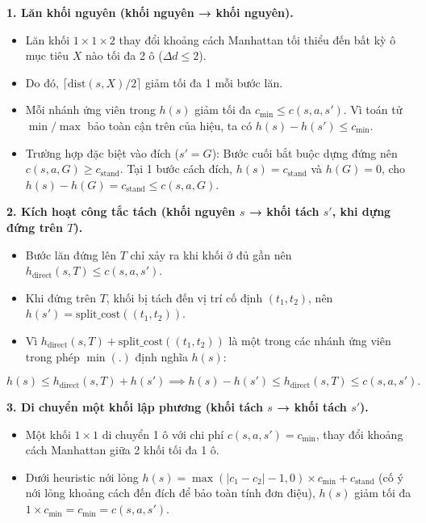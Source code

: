 \textbf{1. Lăn khối nguyên (khối nguyên → khối nguyên).}

\begin{itemize}
\item Lăn khối $1\times 1\times 2$ thay đổi khoảng cách Manhattan tối thiểu đến bất kỳ ô mục tiêu $X$ nào tối đa 2 ô ($\Delta d \le 2$).
\item Do đó, $\lceil \text{dist}(s, X) / 2 \rceil$ giảm tối đa 1 mỗi bước lăn.
\item Mỗi nhánh ứng viên trong $h(s)$ giảm tối đa $c_{\min} \le c(s, a, s')$. Vì toán tử $\min/\max$ bảo toàn cận trên của hiệu, ta có $h(s) - h(s') \le c_{\min}$.
\item Trường hợp đặc biệt vào đích ($s' = G$): Bước cuối bắt buộc dựng đứng nên $c(s, a, G) \ge c_{\text{stand}}$. Tại 1 bước cách đích, $h(s) = c_{\text{stand}}$ và $h(G) = 0$, cho $h(s) - h(G) = c_{\text{stand}} \le c(s, a, G)$.
\end{itemize}

\textbf{2. Kích hoạt công tắc tách (khối nguyên $s$ → khối tách $s'$, khi dựng đứng trên $T$).}

\begin{itemize}
\item Bước lăn đứng lên $T$ chỉ xảy ra khi khối ở đủ gần nên $h_{\text{direct}}(s, T) \le c(s, a, s')$.
\item Khi đứng trên $T$, khối bị tách đến vị trí cố định $(t_1, t_2)$, nên $h(s') = \text{split\_cost}((t_1, t_2))$.
\item Vì $h_{\text{direct}}(s, T) + \text{split\_cost}((t_1, t_2))$ là một trong các nhánh ứng viên trong phép $\min(.)$ định nghĩa $h(s)$:
\end{itemize}

\[h(s) \le h_{\text{direct}}(s, T) + h(s') \implies h(s) - h(s') \le h_{\text{direct}}(s, T) \le c(s, a, s').\]

\textbf{3. Di chuyển một khối lập phương (khối tách $s$ → khối tách $s'$).}

\begin{itemize}
\item Một khối $1\times 1$ di chuyển 1 ô với chi phí $c(s, a, s') = c_{\min}$, thay đổi khoảng cách Manhattan giữa 2 khối tối đa 1 ô.
\item Dưới heuristic nới lỏng $h(s) = \max(|c_1 - c_2| - 1, 0) \times c_{\min} + c_{\text{stand}}$ (cố ý nới lỏng khoảng cách đến đích để bảo toàn tính đơn điệu), $h(s)$ giảm tối đa $1 \times c_{\min} = c_{\min} = c(s, a, s')$.
\end{itemize}

